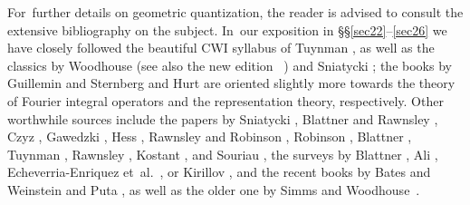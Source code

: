 \documentclass[11pt]{amsart}
\numberwithin{equation}{section}
\theoremstyle{remark}
\begin{document}
For~further details on geometric quantization, the reader is advised to consult
the extensive bibliography on the subject. In~our exposition in
\S\S\ref{sec22}--\ref{sec26} we
have closely followed the beautiful CWI syllabus of Tuynman \cite{bib:TuyCWI},
as well as the classics by Woodhouse \cite{bib:WoodhOLD} (see also the new
edition~ \cite{bib:Woodh}) and Sniatycki \cite{bib:SniaB}; the books by
Guillemin and Sternberg \cite{bib:GuiSt} and Hurt \cite{bib:Hurt} are oriented
slightly more towards the theory of Fourier integral operators and the
representation theory, respectively. Other worthwhile sources include the
papers by Sniatycki \cite{bib:SniaA}, Blattner and Rawnsley \cite{bib:BlatRaw}
\cite{bib:BlattRaCo}, Czyz \cite{bib:Czyz}, Gawedzki \cite{bib:GaweD}, Hess
\cite{bib:Hess}, Rawnsley and Robinson \cite{bib:RawnRob}, Robinson
\cite{bib:RobiTAMS}, Blattner \cite{bib:BlattPSPM} \cite{bib:BlattGSPM}
\cite{bib:BlattLN}, Tuynman \cite{bib:TuyWis} \cite{bib:TuyIrr}
\cite{bib:TuyGBK} \cite{bib:TuyCm}, Rawnsley \cite{bib:RawnCMP},
Kostant\cite{bib:KostSymp} \cite{bib:KostOno} \cite{bib:Kost}, and Souriau
\cite{bib:SouSD}, the surveys by Blattner \cite{bib:Blatt}, Ali
\cite{bib:AliSurv}, Echeverria-Enriquez et~al.~\cite{bib:EEMLRRVM}, or Kirillov
\cite{bib:KiriEMS}, and the recent books by Bates and Weinstein
\cite{bib:BaWei} and Puta \cite{bib:Puta}, as well as the older one by Simms
and Woodhouse~\cite{bib:SimWo}.
\end{document}
